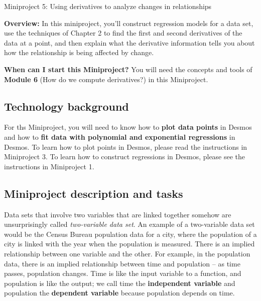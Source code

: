 \documentclass[11pt,letterpaper]{article}
\begin{document}
\begin{flushright}
	\begin{Large}
		Miniproject 5: Using derivatives to analyze changes in relationships 
	\end{Large}
\end{flushright}

\noindent
\textbf{Overview:} In this miniproject, you'll construct regression models for a data set, use the techniques of Chapter 2 to find the first and second derivatives of the data at a point, and then explain what the derivative information tells you about how the relationship is being affected by change. 

\medskip

\noindent
\textbf{When can I start this Miniproject?} You will need the concepts and tools of \textbf{Module 6} (How do we compute derivatives?) in this Miniproject.

	

\hrulefill


\subsection*{Technology background}

For ths Miniproject, you will need to know how to \textbf{plot data points} in Desmos and how to \textbf{fit data with polynomial and exponential regressions} in Desmos. To learn how to plot points in Desmos, please read the instructions in Miniproject 3. To learn how to construct regressions in Desmos, please see the instructions in Miniproject 1. 

\subsection*{Miniproject description and tasks}

Data sets that involve two variables that are linked together somehow are unsurprisingly called \emph{two-variable data set}. An example of a two-variable data set would be the Census Bureau population data for a city, where the population of a city is linked with the year when the population is measured. There is an implied relationship between one variable and the other. For example, in the population data, there is an implied relationship between time and population -- as time passes, population changes. Time is like the input variable to a function, and population is like the output; we call time the \textbf{independent variable} and population the \textbf{dependent variable} because population depends on time. 
\end{document}
